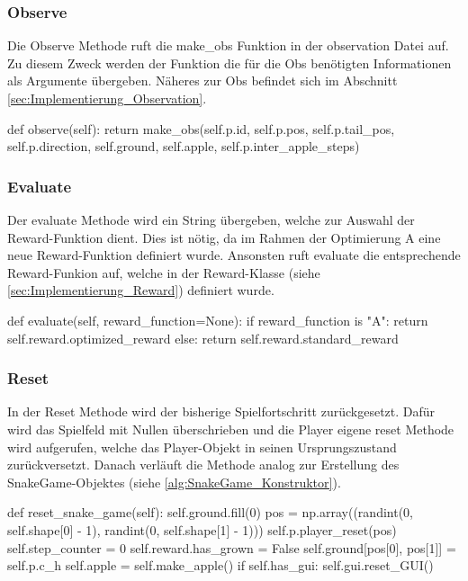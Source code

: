 \subsubsection{Observe} \label{sec:Implementierung-Observe}
Die Observe Methode ruft die make\_obs Funktion in der observation Datei auf. Zu diesem Zweck werden der Funktion die für die Obs benötigten Informationen als Argumente übergeben. Näheres zur Obs befindet sich im Abschnitt \ref{sec:Implementierung_Observation}.
\begin{python}
    def observe(self):
			return make_obs(self.p.id, self.p.pos, self.p.tail_pos,
							  		  self.p.direction, self.ground, self.apple, 
							  		  self.p.inter_apple_steps)
\end{python}

\subsubsection{Evaluate} \label{sec:Implementierung-Evaluate}
Der evaluate Methode wird ein String übergeben, welche zur Auswahl der Reward-Funktion dient. Dies ist nötig, da im Rahmen der Optimierung A eine neue Reward-Funktion definiert wurde. Ansonsten ruft evaluate die entsprechende Reward-Funkion auf, welche in der Reward-Klasse (siehe \ref{sec:Implementierung_Reward}) definiert wurde.
\begin{python}
	def evaluate(self, reward_function=None):
		if reward_function is "A":
			return self.reward.optimized_reward
		else:
			return self.reward.standard_reward
\end{python}

\subsubsection{Reset} \label{sec:Implementierung-Reset}
In der Reset Methode wird der bisherige Spielfortschritt zurückgesetzt. Dafür wird das Spielfeld mit Nullen überschrieben und die Player eigene reset Methode wird aufgerufen, welche das Player-Objekt in seinen Ursprungszustand zurückversetzt. Danach verläuft die Methode analog zur Erstellung des SnakeGame-Objektes (siehe \ref{alg:SnakeGame_Konstruktor}).
\begin{python}
	def reset_snake_game(self):
		self.ground.fill(0)
		pos = np.array((randint(0, self.shape[0] - 1), 
								    randint(0, self.shape[1] - 1)))
		self.p.player_reset(pos)
		self.step_counter = 0
		self.reward.has_grown = False
		self.ground[pos[0], pos[1]] = self.p.c_h
		self.apple = self.make_apple()
		if self.has_gui:
			self.gui.reset_GUI()
\end{python}

